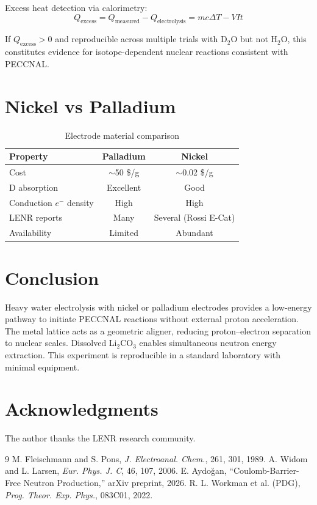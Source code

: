 \documentclass[12pt,a4paper]{article}
\begin{document}
Excess heat detection via calorimetry:
\begin{equation}
Q_\text{excess} = Q_\text{measured} - Q_\text{electrolysis}
= mc\Delta T - VIt
\end{equation}

If $Q_\text{excess} > 0$ and reproducible across multiple trials
with D$_2$O but not H$_2$O, this constitutes evidence for
isotope-dependent nuclear reactions consistent with PECCNAL.

\section{Nickel vs Palladium}

\begin{table}[h!]
\centering
\caption{Electrode material comparison}
\vspace{0.5em}
\begin{tabular}{lcc}
\toprule
\textbf{Property} & \textbf{Palladium} & \textbf{Nickel} \\
\midrule
Cost & $\sim$50 \$/g & $\sim$0.02 \$/g \\
D absorption & Excellent & Good \\
Conduction $e^-$ density & High & High \\
LENR reports & Many & Several (Rossi E-Cat) \\
Availability & Limited & Abundant \\
\bottomrule
\end{tabular}
\end{table}

\section{Conclusion}
Heavy water electrolysis with nickel or palladium electrodes
provides a low-energy pathway to initiate PECCNAL reactions
without external proton acceleration. The metal lattice acts as
a geometric aligner, reducing proton--electron separation to
nuclear scales. Dissolved Li$_2$CO$_3$ enables simultaneous
neutron energy extraction. This experiment is reproducible in
a standard laboratory with minimal equipment.

\section*{Acknowledgments}
The author thanks the LENR research community.

\begin{thebibliography}{9}
 M. Fleischmann and S. Pons, \textit{J. Electroanal. Chem.}, 261, 301, 1989.
 A. Widom and L. Larsen, \textit{Eur. Phys. J. C}, 46, 107, 2006.
 E. Aydoğan, ``Coulomb-Barrier-Free Neutron Production,'' arXiv preprint, 2026.
 R. L. Workman et al. (PDG), \textit{Prog. Theor. Exp. Phys.}, 083C01, 2022.
\end{thebibliography}
\end{document}
